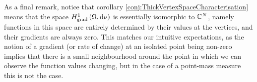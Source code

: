 As a final remark, notice that corollary \ref{conj:ThickVertexSpaceCharacterisation} means that the space $H^1_\mathrm{grad}\left( \Omega, \mathrm{d}\nu \right)$ is essentially isomorphic to $\mathbb{C}^N$, namely functions in this space are entirely determined by their values at the vertices, and their gradients are always zero.
This matches our intuitive expectations, as the notion of a gradient (or rate of change) at an isolated point being non-zero implies that there is a small neighbourhood around the point in which we can observe the function values changing, but in the case of a point-mass measure this is not the case.